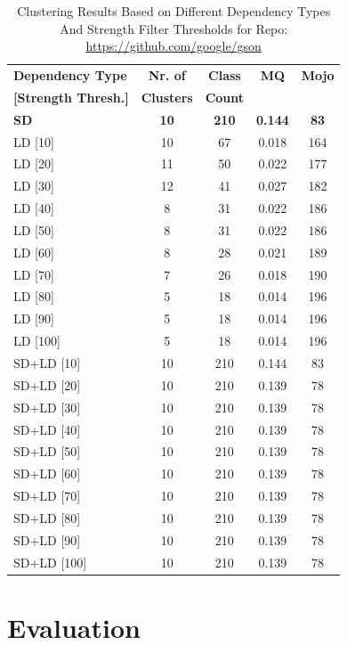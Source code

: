 \documentclass{ieeeaccess}
\begin{document}
\begin{table}[h]
\caption{Clustering Results Based on Different Dependency Types And Strength Filter Thresholds for Repo: \href{https://github.com/google/gson}{https://github.com/google/gson}}
\label{tab:clustering_results_gson}
\centering
\setlength{\tabcolsep}{10pt}
\begin{tabular}{|l|c|c|c|c|}
\hline
\textbf{Dependency Type} & \textbf{Nr. of} & \textbf{Class} & \textbf{MQ} & \textbf{Mojo} \\
\textbf{[Strength Thresh.]} & \textbf{Clusters} & \textbf{Count} &  &  \\
\hline
\textbf{SD} & \textbf{10} & \textbf{210} & \textbf{0.144} & \textbf{83} \\
LD [10] & 10 & 67 & 0.018 & 164 \\
LD [20] & 11 & 50 & 0.022 & 177 \\
LD [30] & 12 & 41 & 0.027 & 182 \\
LD [40] & 8 & 31 & 0.022 & 186 \\
LD [50] & 8 & 31 & 0.022 & 186 \\
LD [60] & 8 & 28 & 0.021 & 189 \\
LD [70] & 7 & 26 & 0.018 & 190 \\
LD [80] & 5 & 18 & 0.014 & 196 \\
LD [90] & 5 & 18 & 0.014 & 196 \\
LD [100] & 5 & 18 & 0.014 & 196 \\
\hline
SD+LD [10] & 10 & 210 & 0.144 & 83 \\
SD+LD [20] & 10 & 210 & 0.139 & 78 \\
SD+LD [30] & 10 & 210 & 0.139 & 78 \\
SD+LD [40] & 10 & 210 & 0.139 & 78 \\
SD+LD [50] & 10 & 210 & 0.139 & 78 \\
SD+LD [60] & 10 & 210 & 0.139 & 78 \\
SD+LD [70] & 10 & 210 & 0.139 & 78 \\
SD+LD [80] & 10 & 210 & 0.139 & 78 \\
SD+LD [90] & 10 & 210 & 0.139 & 78 \\
SD+LD [100] & 10 & 210 & 0.139 & 78 \\
\hline
\end{tabular}
\end{table}



\section{Evaluation}
\label{sec:evaluation}
\end{document}
